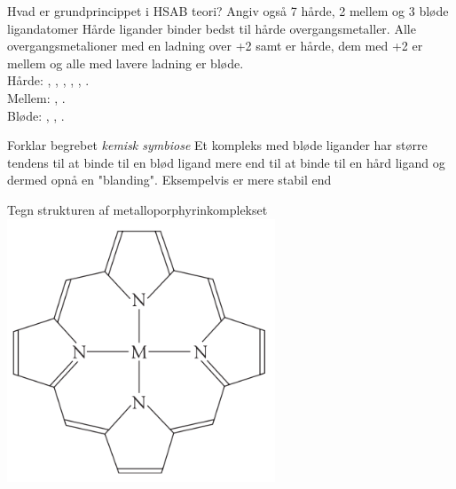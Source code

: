 \begin{flashcard}[Teori]{Hvad er grundprincippet i HSAB teori?
Angiv også 7 hårde, 2 mellem og 3 bløde ligandatomer}
Hårde ligander binder bedst til hårde overgangsmetaller.
Alle overgangsmetalioner med en ladning over +2 samt  er hårde, dem med +2 er mellem og alle med lavere ladning er bløde.\\\vspace*{0.3cm}
Hårde: , , , , , .\\
Mellem: , .\\
Bløde: , , .  
\end{flashcard}


\begin{flashcard}[Teori]{Forklar begrebet \textit{kemisk symbiose}}
Et kompleks med bløde ligander har større tendens til at binde til en blød ligand mere end til at binde til en hård ligand og dermed opnå en "blanding".
Eksempelvis er  mere stabil end 
\end{flashcard}


\begin{flashcard}[Struktur]{Tegn strukturen af metalloporphyrinkomplekset}
\includegraphics[width=0.6\textwidth]{figures/k19s529porphyrin.png}
\end{flashcard}